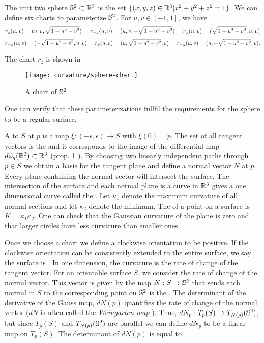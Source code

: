 \begin{example}\label{ex:sphere-charts}

The unit two sphere $\mathbb{S}^2\subset \mathbb{R}^3$ is the set $\{(x,y,z)\in \mathbb{R}^3 | x^2+y^2+z^2=1\}.$
We can define six charts to parameterize $\mathbb{S}^2$.
For $u,v\in[-1,1]$, we have
$$r_{z}(u,v)=(u,v,\sqrt{1-u^2-v^2}) \hspace{.5cm}  r_{-z}(u,v)=(u,v,-\sqrt{1-u^2-v^2}) \hspace{.5cm}  r_{x}(u,v)=(\sqrt{1-u^2-v^2},u,v) $$
$$r_{-x}(u,v)=(-\sqrt{1-u^2-v^2},u,v) \hspace{.5cm}  r_{y}(u,v)=(u,\sqrt{1-u^2-v^2},v) \hspace{.5cm}   r_{-y}(u,v)=(u,-\sqrt{1-u^2-v^2},v). $$

The chart $r_{z}$ is shown in 

\begin{figure}[htb]
	\centering
	\texttt{[image: curvature/sphere-chart]}
	\caption{A chart of $\mathbb{S}^2$.}
	\label{fig:sphere-chart}
\end{figure}

One can verify that these parameterizations fullfil the requirements
for the sphere to be a regular surface.

\end{example}


A  to $S$ at $p$ is a map $\xi:(-\epsilon,\epsilon)\to S$ with $\xi(0)=p$.
The set of all tangent vectors is the  and it corresponds to the image
of the differential map $d\phi_q(\mathbb{R}^2)\subset \mathbb{R}^3$ (prop. 1 \cite{doc76}).
By choosing two linearly independent paths through $p\in S$ we obtain a basis 
for the tangent
plane and define a normal vector $N$ at $p$.
Every plane containing the normal vector will intersect the surface.
The intersection of the surface and each normal plane is a curve in $\mathbb{R}^3$
gives a one dimensional curve called the . 
Let $\kappa_1$ denote the maximum curvature of all normal sections 
and let $\kappa_2$ denote the minimum. 
The  of a point on a surface is
$K=\kappa_1\kappa_2.$
One can check that the Gaussian curvature of the plane is zero and
that larger circles have less curvature than smaller ones.

Once we choose a chart we define a clockwise orientation to be positive.
 If the clockwise
orientation can be consistently extended to the entire surface, we say
the surface is .
In one dimension, the curvature is the rate of change of the tangent vector.
For an orientable surface $S$, we consider the rate of change of the normal vector.
This vector is given by the map  $N:S\to \mathbb{S}^2$ that sends each
normal in $S$ to the corresponding point on $\mathbb{S}^2$ is
the .
The determinant of the derivative of the Gauss map, $dN(p)$ quantifies the rate of change of
the normal vector ($dN$ is often called the \emph{Weingarten map} \cite{Crane:2013}).
Thus, $dN_p:T_p(S)\to T_{N(p)}(\mathbb{S}^2)$, but since $T_p(S)$ and $T_{N(p)}(\mathbb{S}^2)$
are parallel we can define $dN_p$ to be a linear map on $T_p(S)$.
The determinant of $dN(p)$ is equal to .

